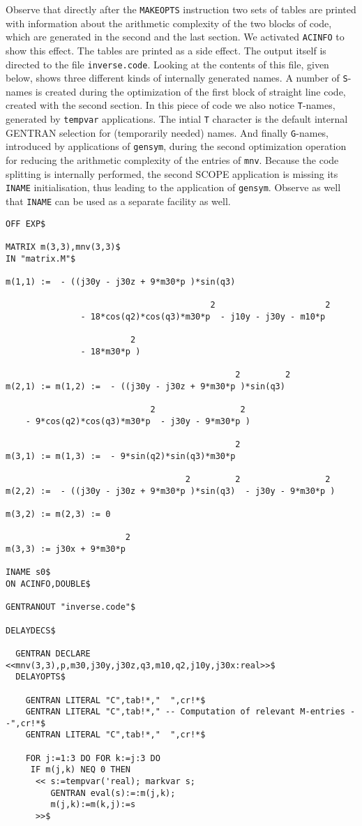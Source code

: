 Observe that directly after the {\tt MAKEOPTS} instruction two sets of tables
are printed with information about the arithmetic complexity of the two blocks
of code, which are generated in the second and the last section.  We
activated {\tt ACINFO} to show this effect.  The tables are printed as
a side effect. The output itself is directed to the file {\tt inverse.code}.
Looking at the contents of this file, given below, shows three different
kinds of internally generated names. A number of {\tt S}-names is created
during the optimization of the first block of straight line code, created with
the second section. In this piece of code we also notice {\tt T}-names,
generated by {\tt tempvar} applications. The intial {\tt T} character is the
default internal GENTRAN selection for (temporarily needed) names.
And finally {\tt G}-names, introduced by
applications of {\tt gensym}, during the second optimization operation for
reducing the arithmetic complexity of the entries of {\tt mnv}. Because the
code splitting is internally performed, the second SCOPE application
is missing its {\tt INAME} initialisation, thus leading to the application of
{\tt gensym}. Observe as well that {\tt INAME} can be used as a separate
facility as well.
{\small
\begin{verbatim}
OFF EXP$

MATRIX m(3,3),mnv(3,3)$
IN "matrix.M"$

m(1,1) :=  - ((j30y - j30z + 9*m30*p )*sin(q3)

                                         2                      2
               - 18*cos(q2)*cos(q3)*m30*p  - j10y - j30y - m10*p

                         2
               - 18*m30*p )

                                              2         2
m(2,1) := m(1,2) :=  - ((j30y - j30z + 9*m30*p )*sin(q3)

                             2                 2
    - 9*cos(q2)*cos(q3)*m30*p  - j30y - 9*m30*p )

                                              2
m(3,1) := m(1,3) :=  - 9*sin(q2)*sin(q3)*m30*p

                                    2         2                 2
m(2,2) :=  - ((j30y - j30z + 9*m30*p )*sin(q3)  - j30y - 9*m30*p )

m(3,2) := m(2,3) := 0

                        2
m(3,3) := j30x + 9*m30*p

INAME s0$
ON ACINFO,DOUBLE$

GENTRANOUT "inverse.code"$

DELAYDECS$

  GENTRAN DECLARE <<mnv(3,3),p,m30,j30y,j30z,q3,m10,q2,j10y,j30x:real>>$
  DELAYOPTS$

    GENTRAN LITERAL "C",tab!*,"  ",cr!*$
    GENTRAN LITERAL "C",tab!*," -- Computation of relevant M-entries --",cr!*$
    GENTRAN LITERAL "C",tab!*,"  ",cr!*$

    FOR j:=1:3 DO FOR k:=j:3 DO
     IF m(j,k) NEQ 0 THEN
      << s:=tempvar('real); markvar s;
         GENTRAN eval(s):=:m(j,k);
         m(j,k):=m(k,j):=s
      >>$
\end{verbatim}}
